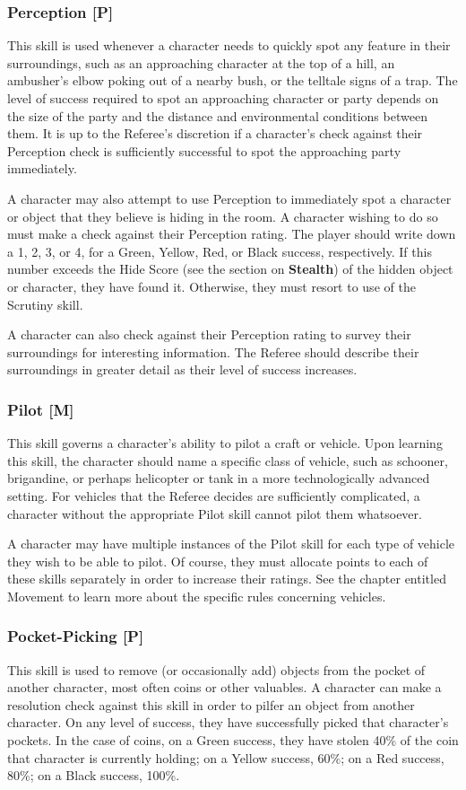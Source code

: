 \documentclass[oneside]{book}
\begin{document}
\begin{multicols}{2}
\subsubsection{Perception [P]}
This skill is used whenever a character needs to quickly spot any feature in their surroundings, such as an approaching character at the top of a hill, an ambusher's elbow poking out of a nearby bush, or the telltale signs of a trap. The level of success required to spot an approaching character or party depends on the size of the party and the distance and environmental conditions between them. It is up to the Referee's discretion if a character's check against their Perception check is sufficiently successful to spot the approaching party immediately. 

A character may also attempt to use Perception to immediately spot a character or object that they believe is hiding in the room. A character wishing to do so must make a check against their Perception rating. The player should write down a 1, 2, 3, or 4, for a Green, Yellow, Red, or Black success, respectively. If this number exceeds the Hide Score (see the section on \textbf{Stealth}) of the hidden object or character, they have found it. Otherwise, they must resort to use of the Scrutiny skill.

A character can also check against their Perception rating to survey their surroundings for interesting information. The Referee should describe their surroundings in greater detail as their level of success increases. 


\subsubsection{Pilot [M]}
This skill governs a character's ability to pilot a craft or vehicle. Upon learning this skill, the character should name a specific class of vehicle, such as schooner, brigandine, or perhaps helicopter or tank in a more technologically advanced setting. For vehicles that the Referee decides are sufficiently complicated, a character without the appropriate Pilot skill cannot pilot them whatsoever.

A character may have multiple instances of the Pilot skill for each type of vehicle they wish to be able to pilot. Of course, they must allocate points to each of these skills separately in order to increase their ratings.
See the chapter entitled Movement to learn more about the specific rules concerning vehicles. 

\subsubsection{Pocket-Picking [P]}
This skill is used to remove (or occasionally add) objects from the pocket of another character, most often coins or other valuables. A character can make a resolution check against this skill in order to pilfer an object from another character. On any level of success, they have successfully picked that character's pockets. In the case of coins, on a Green success, they have stolen 40\% of the coin that character is currently holding; on a Yellow success, 60\%; on a Red success, 80\%; on a Black success, 100\%.


\end{multicols}
\end{document}
